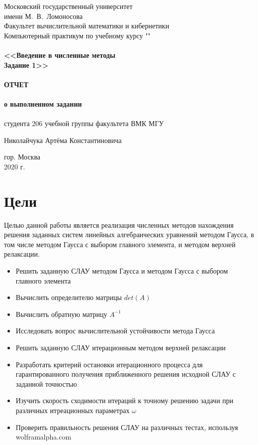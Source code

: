 \documentclass[a4paper,12pt,titlepage,finall]{article}
\begin{document}
\begin{titlepage}
    \begin{center}
	{\small \sc Московский государственный университет \\имени М.~В.~Ломоносова\\
	Факультет вычислительной математики и кибернетики\\}
	\vfill
	{\Large \sc Компьютерный практикум по учебному курсу ""}\\
	~\\
	{\large \bf <<Введение в численные методы \\
	Задание 1>>}\\
	~\\
	{\large \bf  ОТЧЕТ \\ }
	~\\
	{\small \bf  о выполненном задании \\ }
	~\\
	{\small \sc студента 206 учебной группы факультета ВМК МГУ\\}

	{\small \sc Николайчука Артёма Константиновича\\}
	\vfill
    \end{center}

    \begin{center}
	\vfill
	{\small гор. Москва\\2020 г.}
    \end{center}
\end{titlepage}

\tableofcontents
\newpage

\section{Цели}

Целью данной работы является реализация численных методов нахождения 
решения заданных систем линейных алгебраических уравнений методом Гаусса, в том числе методом Гаусса с выбором главного элемента, и методом верхней релаксации. 

\begin{itemize}
\item Решить заданную СЛАУ  методом Гаусса и методом Гаусса с выбором главного элемента
\item Вычислить определителю матрицы $det(A)$
\item Вычислить обратную матрицу  $A ^ {-1}$
\item Исследовать вопрос вычислительной  устойчивости метода Гаусса
\item Решить заданную СЛАУ итерационным методом верхней релаксации
\item Разработать критерий остановки итерационного процесса для гарантированного получения приближенного решения исходной СЛАУ с заданной точностью
\item Изучить скорость сходимости итераций к точному решению задачи при различных итреационных параметрах $\omega$
\item Проверить правильность решения СЛАУ на различных тестах, используя wolframalpha.com
\end{itemize}
\end{document}
